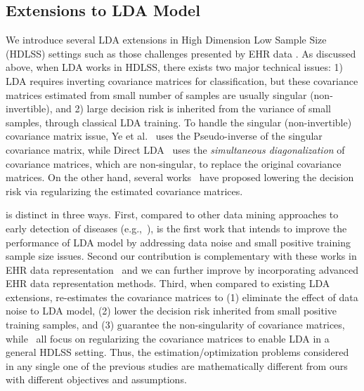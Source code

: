 
\subsection{Extensions to LDA Model}

We introduce several LDA extensions in High Dimension Low Sample Size (HDLSS) settings such as those challenges presented by EHR data .
As discussed above, when LDA works in HDLSS, there exists two major technical issues: 1) LDA requires inverting covariance matrices for classification, but these covariance matrices estimated from small number of samples are usually singular (non-invertible), and 2) large decision risk is inherited from the variance of small samples, through classical LDA training.
To handle the singular (non-invertible) covariance matrix issue, Ye et al.~\cite{ye2004optimization} uses the Pseudo-inverse of the singular covariance matrix, while Direct LDA~\cite{lu2003face,gao2006direct} uses the \emph{simultaneous diagonalization} of covariance matrices, which are non-singular, to replace the original covariance matrices.
On the other hand, several works~\cite{clemmensen2011sparse,qiao2008effective,shao2011sparse} have proposed lowering the decision risk via regularizing the estimated covariance matrices.


\TheName{} is distinct in three ways.
First, compared to other data mining approaches to early detection of diseases (e.g.,~\cite{Lindstrom01032003,riskprediction,zheng_predictive_2015,yoo_data_2011}), \TheName{} is the first work that intends to improve the performance of LDA model by addressing data noise and small positive training sample size issues.
%
Second our contribution is complementary with these works in EHR data representation~\cite{wang_towards_2012,wang_framework_2012,liu_temporal_2015} and we can further improve \TheName{} by incorporating advanced EHR data representation methods.
Third, when compared to existing LDA extensions, \TheName{} re-estimates the covariance matrices to (1)  eliminate the effect of data noise to LDA model, (2) lower the decision risk inherited from  small positive training samples, and (3) guarantee the non-singularity of covariance matrices, while~\cite{ye2004optimization,lu2003face,gao2006direct,clemmensen2011sparse,qiao2008effective,shao2011sparse} all focus on regularizing the covariance matrices to enable LDA in a general HDLSS setting.
Thus, the estimation/optimization problems considered in any single one of the previous studies are mathematically different from ours with different objectives and assumptions.


